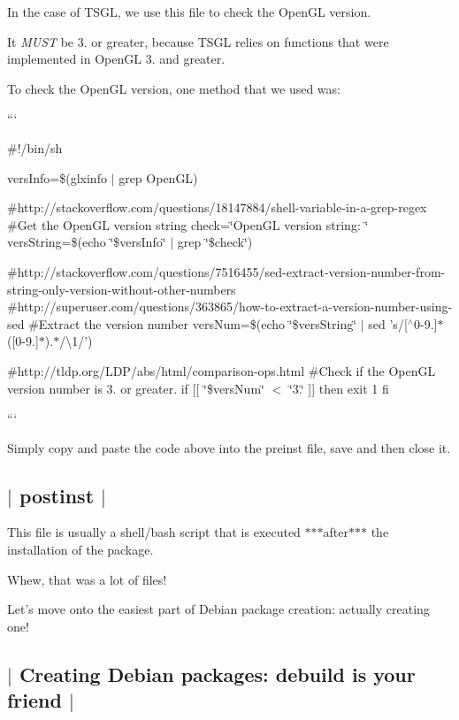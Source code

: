 In the case of T\-S\-G\-L, we use this file to check the Open\-G\-L version.

It {\itshape M\-U\-S\-T} be 3. or greater, because T\-S\-G\-L relies on functions that were implemented in Open\-G\-L 3. and greater.

To check the Open\-G\-L version, one method that we used was\-:

```

\#!/bin/sh

vers\-Info=\$(glxinfo $\vert$ grep Open\-G\-L)

\#http\-://stackoverflow.com/questions/18147884/shell-\/variable-\/in-\/a-\/grep-\/regex \#\-Get the Open\-G\-L version string check=\char`\"{}\-Open\-G\-L version string\-: \char`\"{} vers\-String=\$(echo \char`\"{}\$vers\-Info\char`\"{} $\vert$ grep \char`\"{}\$check\char`\"{})

\#http\-://stackoverflow.com/questions/7516455/sed-\/extract-\/version-\/number-\/from-\/string-\/only-\/version-\/without-\/other-\/numbers \#http\-://superuser.com/questions/363865/how-\/to-\/extract-\/a-\/version-\/number-\/using-\/sed \#\-Extract the version number vers\-Num=\$(echo \char`\"{}\$vers\-String\char`\"{} $\vert$ sed 's/\mbox{[}$^\wedge$0-\/9.\mbox{]}$\ast$(\mbox{[}0-\/9.\mbox{]}$\ast$).$\ast$/\textbackslash{}1/')

\#http\-://tldp.org/\-L\-D\-P/abs/html/comparison-\/ops.\-html \#\-Check if the Open\-G\-L version number is 3. or greater. if \mbox{[}\mbox{[} \char`\"{}\$vers\-Num\char`\"{} $<$ \char`\"{}3.\char`\"{} \mbox{]}\mbox{]} then exit 1 fi

```

Simply copy and paste the code above into the preinst file, save and then close it. 

 \subsection*{$\vert$ postinst $\vert$ }

This file is usually a shell/bash script that is executed $\ast$$\ast$$\ast$after$\ast$$\ast$$\ast$ the installation of the package.

Whew, that was a lot of files!

Let's move onto the easiest part of Debian package creation\-: actually creating one! 

 \subsection*{$\vert$ Creating Debian packages\-: debuild is your friend $\vert$ }

